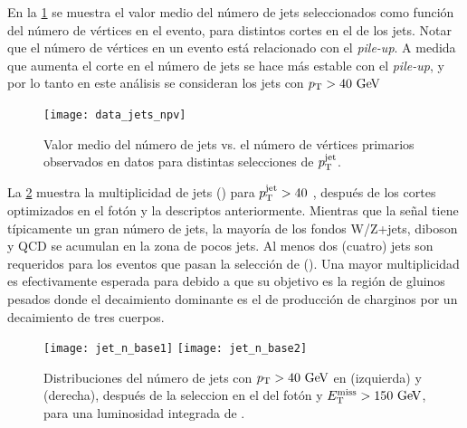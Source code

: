 En la \cref{fig:jets_npv} se muestra el valor medio del número de jets
seleccionados como función del número de vértices en el evento, para distintos
cortes en el {\pt} de los jets. Notar que el número de vértices en un evento
está relacionado con el \emph{pile-up}. A medida que aumenta el corte en {\pt}
el número de jets se hace más estable con el \emph{pile-up}, y por lo tanto en
este análisis se consideran los jets con $\pt>40\gev$



\begin{figure}[!h]
  \centering
  \texttt{[image: data\_jets\_npv]}
  \caption{Valor medio del número de jets vs. el número de vértices primarios
    observados en datos para distintas selecciones de $p_{\mathrm{T}}^{\mathrm{jet}}$.}
    \label{fig:jets_npv}
\end{figure}




La \cref{fig:opt_jet_n} muestra la multiplicidad de jets (\njets)
para $p_{\mathrm{T}}^{\mathrm{jet}} > 40$ \gev, después de los cortes optimizados en el
fotón y la {\met} descriptos anteriormente. Mientras que la señal tiene
típicamente un gran número de jets, la mayoría de los fondos W/Z+jets, diboson y
QCD se acumulan en la zona de pocos jets. Al menos dos (cuatro) jets son
requeridos para los eventos que pasan la selección de {\SRL} ({\SRH}). Una mayor
multiplicidad es efectivamente esperada para {\SRL} debido a que su objetivo es
la región de gluinos pesados donde el decaimiento dominante es el de producción
de charginos por un decaimiento de tres cuerpos.

\begin{figure}[!h]
  \centering
  \texttt{[image: jet\_n\_base1]}
  \texttt{[image: jet\_n\_base2]}
  \caption{Distribuciones del número de jets con $\pt > 40 \gev$ en {\SRL} (izquierda) y {\SRH} (derecha),
    después de la seleccion en el {\pt} del fotón y $\met > 150\gev$,
    para una luminosidad integrada de {\ilumi}.}
  \label{fig:opt_jet_n}
\end{figure}

